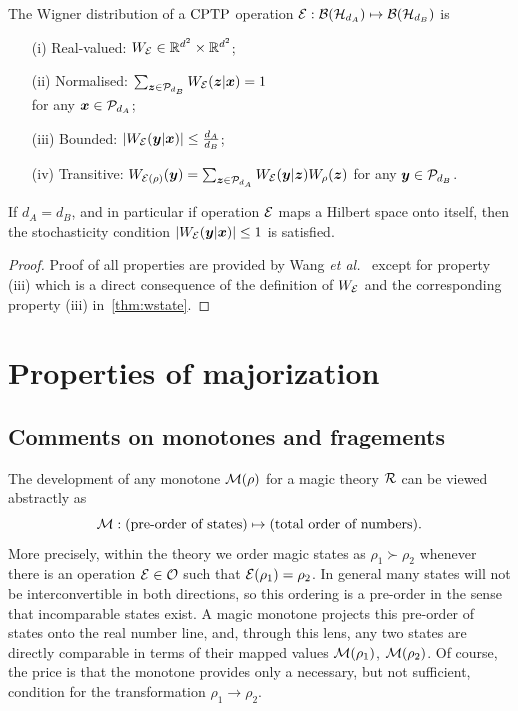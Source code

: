 \begin{proposition}
    \label{thm:wchannel}
    The Wigner distribution of a ${\rm{CPTP}}$ operation ${\mathcal E}: \mathcal{B}(\mathcal{H}_{d_A}) \mapsto \mathcal{B}(\mathcal{H}_{d_B})$ is
    \begin{enumerate}
        \item[(i)]\label{en:wo1} Real-valued: $\W{\E} \in \mathbb{R}^{d^2} \times \mathbb{R}^{d^2}$;
        \item[(ii)]\label{en:wo2} Normalised: $\sum_{\bmz \in \cal{P}_{d_B}} \W[\bmz|\bmx]{\E} = 1$ \\ 
        for any $\bm{x} \in \mathcal{P}_{d_A}$;
        \item[(iii)]\label{en:wo3} Bounded: $\abs{\W[\bmy|\bmx]{\E}} \leq \frac{d_A}{d_B}$;
	    \item[(iv)]\label{en:wo4} Transitive: $\W[\bmy]{\E(\rho)} = \sum_{\bmz \in \cal{P}_{d_A}} \W[\bmy|\bmz]{\E} \W[\bmz]{\rho}$ for any $\bm{y} \in \mathcal{P}_{d_B}$.
    \end{enumerate}
\end{proposition}
If $d_A = d_B$, and in particular if operation ${\mathcal E}$ maps a Hilbert space onto itself, then the stochasticity condition $\abs{\W[\bmy|\bmx]{\E}} \leq 1$ is satisfied.
\begin{proof}
	Proof of all properties are provided by Wang \textit{et al.}~\cite{Wang_2019} except for property (iii) which is a direct consequence of the definition of $\W{\E}$ and the corresponding property (iii) in~\cref{thm:wstate}.
\end{proof}


\section{Properties of majorization}
\label{app:major}


\subsection{Comments on monotones and fragements}
The development of any monotone ${\mathcal M}(\rho)$ for a magic theory ${\mathcal R}$ can be viewed abstractly as
\begin{equation}
{\mathcal M} : \mbox{(pre-order of states)} \mapsto \mbox{(total order of numbers).} \nonumber
\end{equation}
More precisely, within the theory we order magic states as $\rho_1 \succ \rho_2$ whenever there is an operation ${\mathcal E} \in {\mathcal O}$ such that ${\mathcal E}(\rho_1) = \rho_2$. In general many states will not be interconvertible in both directions, so this ordering is a pre-order in the sense that incomparable states exist. A magic monotone projects this pre-order of states onto the real number line, and, through this lens, any two states are directly comparable in terms of their mapped values ${\mathcal M}(\rho_1)$, ${\mathcal M}(\rho_2)$. Of course, the price is that the monotone provides only a necessary, but not sufficient, condition for the transformation $\rho_1 \rightarrow \rho_2$.


